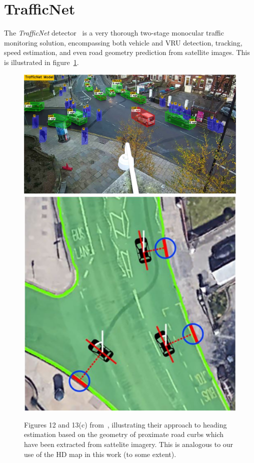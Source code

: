 \section{TrafficNet}
\label{sec:related-trafficnet}

The \textit{TrafficNet} detector~\cite{rezaei2021traffic} is a very thorough two-stage monocular traffic monitoring solution, encompassing both vehicle and VRU detection, tracking, speed estimation, and even road geometry prediction from satellite images.
This is illustrated in figure~\ref{fig:related-tranet}.

\begin{figure}[htb]
    \centering
    \includegraphics[width=0.63\linewidth]{figures/tranet}
    \includegraphics[width=0.35\linewidth]{figures/tranet-angle-estimation}
    \caption{Figures 12 and 13(c) from~\cite{rezaei2021traffic}, illustrating their approach to heading estimation based on the geometry of proximate road curbs which have been extracted from sattelite imagery. This is analogous to our use of the HD map in this work (to some extent).}
    \label{fig:related-tranet}
\end{figure}

